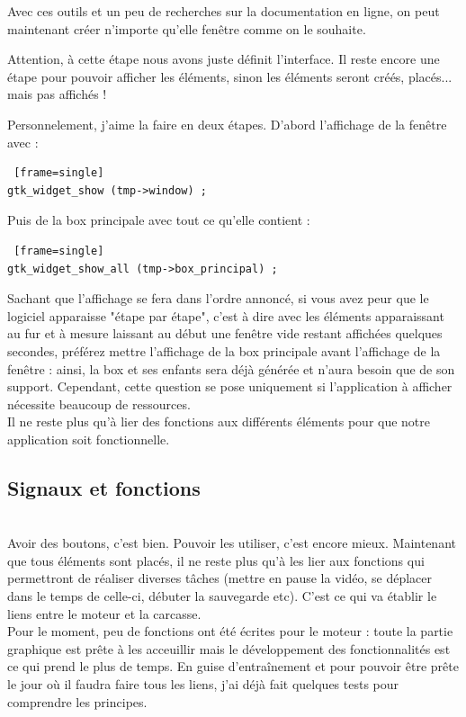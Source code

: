 \documentclass[11pt,french,a4paper]{report}
\begin{document}
Avec ces outils et un peu de recherches sur la documentation en ligne, on peut maintenant créer n'importe qu'elle fenêtre 
comme on le souhaite. 

Attention, à cette étape nous avons juste définit l'interface. Il reste encore une étape pour pouvoir afficher les éléments, sinon
les éléments seront créés, placés... mais pas affichés ! 

Personnelement, j'aime la faire en deux étapes. D'abord l'affichage de la fenêtre avec : \\
\begin{lstlisting} [frame=single]
gtk_widget_show (tmp->window) ;
\end{lstlisting}

Puis de la box principale avec tout ce qu'elle contient : \\
\begin{lstlisting} [frame=single]
gtk_widget_show_all (tmp->box_principal) ; 
\end{lstlisting}

Sachant que l'affichage se fera dans l'ordre annoncé, si vous avez peur que le logiciel apparaisse "étape par étape", c'est à 
dire avec les éléments apparaissant au fur et à mesure laissant au début une fenêtre vide restant affichées quelques secondes, 
préférez mettre l'affichage de la box principale avant l'affichage de la fenêtre : ainsi, la box et ses enfants sera déjà générée 
et n'aura besoin que de son support. Cependant, cette question se pose uniquement si l'application à afficher nécessite beaucoup de 
ressources. \\

Il ne reste plus qu'à lier des fonctions aux différents éléments pour que notre application soit 
fonctionnelle.\\
        
        \subsection{Signaux et fonctions} \\
Avoir des boutons, c'est bien. Pouvoir les utiliser, c'est encore mieux. Maintenant que tous éléments sont placés, 
il ne reste plus qu'à les lier aux fonctions qui permettront de réaliser diverses tâches (mettre en pause la vidéo,
se déplacer dans le temps de celle-ci, débuter la sauvegarde etc).    
C'est ce qui va établir le liens entre le moteur et la carcasse. \\

Pour le moment, peu de fonctions ont été écrites pour le moteur : toute la partie graphique est prête à les acceuillir 
mais le développement des fonctionnalités est ce qui prend le plus de temps. En guise d'entraînement et pour 
pouvoir être prête le jour où il faudra faire tous les liens, j'ai déjà fait quelques tests pour comprendre les principes. \\
\end{document}
